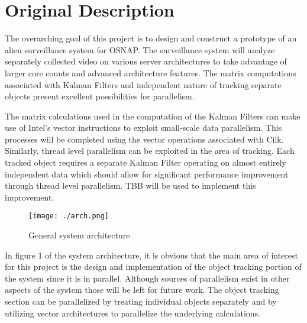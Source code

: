 \section{Original Description}

The overarching goal of this project is to design and construct a prototype of an alien surveillance system for OSNAP.  The surveillance system will analyze separately collected video on various server architectures to take advantage of larger core counts and advanced architecture features. The matrix computations associated with Kalman Filters and independent nature of tracking separate objects present excellent possibilities for parallelism.

 The matrix calculations used in the computation of the Kalman Filters can make use of Intel's vector instructions to exploit small-scale data parallelism. This processes will be completed using the vector operations associated with Cilk. Similarly, thread level parallelism can be exploited in the area of tracking. Each tracked object requires a separate Kalman Filter operating on almost entirely independent data which should allow for significant performance improvement through thread level parallelism. TBB will be used to implement this improvement.

\begin{figure}
\texttt{[image: ./arch.png]}
\label{fig}
  \caption{General system architecture}
\end{figure}


In figure 1 of the system architecture, it is obvious that the main area of interest for this project is the design and implementation of the object tracking portion of the system since it is in parallel. Although sources of parallelism exist in other aspects of the system those will be left for future work. The object tracking section can be parallelized by treating individual objects separately and by utilizing vector architectures to parallelize the underlying calculations.